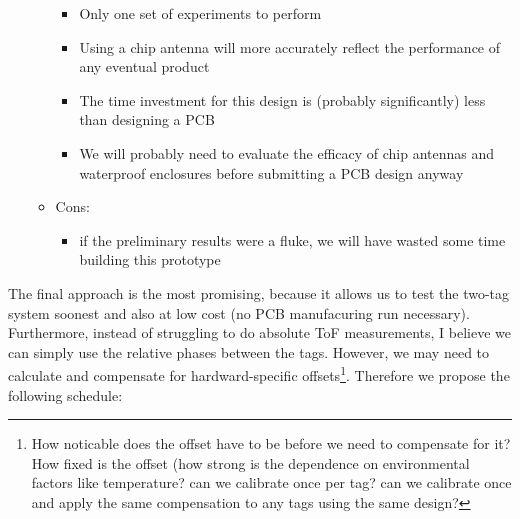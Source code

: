 \documentclass[12pt]{article}
\begin{document}
\begin{enumerate}
\begin{itemize}
\begin{itemize}
\item Only one set of experiments to perform
\item Using a chip antenna will more accurately reflect the performance of any eventual product
\item The time investment for this design is (probably significantly) less than designing a PCB
\item We will probably need to evaluate the efficacy of chip antennas and waterproof enclosures before submitting a PCB design anyway
\end{itemize}
\item Cons: 
\begin{itemize}
\item if the preliminary results were a fluke, we will have wasted some time building this prototype
\end{itemize}
\end{itemize}
\end{enumerate}

The final approach is the most promising, because it allows us to test
the two-tag system soonest and also at low cost (no PCB manufacuring
run necessary). Furthermore, instead of struggling to do absolute ToF
measurements, I believe we can simply use the relative phases between
the tags. However, we may need to calculate and compensate for
hardward-specific offsets\footnote{How noticable does the offset have
  to be before we need to compensate for it? How fixed is the offset
  (how strong is the dependence on environmental factors like
  temperature? can we calibrate once per tag? can we calibrate once
  and apply the same compensation to any tags using the same
  design?}. Therefore we propose the following schedule:
\end{document}
